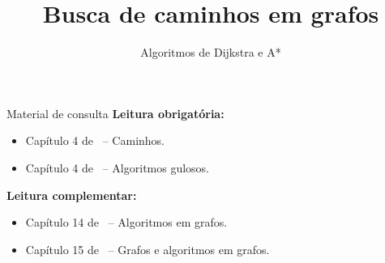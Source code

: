\newcommand{\defs}{../defs}


\title[Busca de caminhos em grafos]{Busca de caminhos em grafos}
\subtitle{Algoritmos de Dijkstra e A*}



\maketitle

\begin{frame}{Material de consulta}
	\textbf{Leitura obrigatória:}
	\begin{itemize}
		\item Capítulo 4 de~\cite{Goldbarg2AndGoldbarg2012} -- Caminhos.
		\item Capítulo 4 de~\cite{KleinbergAndTardos2006} -- Algoritmos gulosos.
	\end{itemize}
	
	\bigskip
	
	\textbf{Leitura complementar:}
	\begin{itemize}
		\item Capítulo 14 de~\cite{GoodrichEtAl2014} -- Algoritmos em grafos.
		\item Capítulo 15 de~\cite{Preiss2001} -- Grafos e algoritmos em grafos.
	\end{itemize}
\end{frame}


